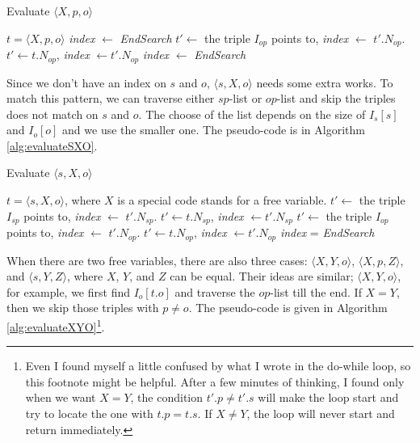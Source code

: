 \documentclass{article}
\begin{document}
\begin{enumerate}
\begin{enumerate}
\begin{algorithm}[H]
\caption{Evaluate $\langle X, p, o\rangle$}\label{alg:evaluateXPO}
\begin{algorithmic}
\Require $t = \langle X, p, o\rangle$
\State \textit{index} $\leftarrow$ \textit{EndSearch}
\EndIf
{} 
\State $t'\leftarrow$ the triple $I_{op}$ points to, \textit{index} $\leftarrow$ $t'.N_{op}$.
\Else{}
\State $t'\leftarrow t.N_{op}$, \textit{index} $\leftarrow t'.N_{op}$
\EndIf
{}
\State \textit{index} $\leftarrow$ \textit{EndSearch}
\EndIf
\end{algorithmic}
\end{algorithm}

Since we don't have an index on $s$ and $o$,  $\langle s, X, o\rangle$ needs some extra works. To match this pattern, we can traverse either $sp$-list or $op$-list and skip the triples does not match on $s$ and $o$. The choose of the list depends on the size of $I_s[s]$ and $I_o[o]$ and we use the smaller one. The pseudo-code is in Algorithm \eqref{alg:evaluateSXO}.

\begin{algorithm}[H]
\caption{Evaluate $\langle s, X, o\rangle$}\label{alg:evaluateSXO}
\begin{algorithmic}
\Require $t = \langle s, X, o\rangle$, where $X$ is a special code stands for a free variable. 
\Do
{}
\State $t'\leftarrow$ the triple $I_{sp}$ points to, \textit{index} $\leftarrow$ $t'.N_{sp}$.
\Else 
\State $t'\leftarrow t.N_{sp}$, \textit{index} $\leftarrow t'.N_{sp}$
\EndIf
{}
\Else
\Do
{}
\State $t'\leftarrow$ the triple $I_{op}$ points to, \textit{index} $\leftarrow$ $t'.N_{op}$.
\Else 
\State $t'\leftarrow t.N_{op}$, \textit{index} $\leftarrow t'.N_{op}$
\EndIf
{}
\EndIf
{}
\State \textit{index} = \textit{EndSearch}
\EndIf 
\end{algorithmic}
\end{algorithm}


When there are two free variables, there are also three cases: $\langle X, Y, o\rangle$, $\langle X, p, Z\rangle$, and $\langle s, Y, Z\rangle$, where $X$, $Y$, and $Z$ can be equal. Their ideas are similar; $\langle X, Y, o\rangle$, for example, we first find $I_o[t.o]$ and traverse the $op$-list till the end. If $X=Y$, then we skip those triples with $p \neq o$. The pseudo-code is given in Algorithm \eqref{alg:evaluateXYO}\footnote{Even I found myself a little confused by what I wrote in the do-while loop, so this footnote might be helpful. After a few minutes of thinking, I found only when we want $X=Y$, the condition $t'.p \neq t'.s$ will make the loop start and try to locate the one with $t.p = t.s$. If $X\neq Y$, the loop will never start and return immediately.}.


\end{enumerate}
\end{enumerate}
\end{document}

